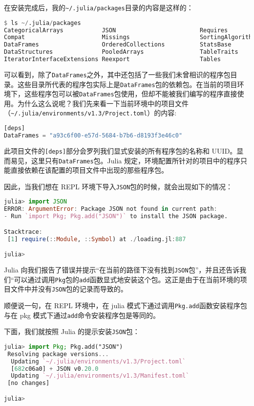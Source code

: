 在安装完成后，我的\verb|~/.julia/packages|目录的内容是这样的：

\begin{lstlisting}[language=julia]
$ ls ~/.julia/packages
CategoricalArrays           JSON                        Requires
Compat                      Missings                    SortingAlgorithms
DataFrames                  OrderedCollections          StatsBase
DataStructures              PooledArrays                TableTraits
IteratorInterfaceExtensions Reexport                    Tables
\end{lstlisting}

可以看到，除了\verb|DataFrames|之外，其中还包括了一些我们未曾相识的程序包目录。这些目录所代表的程序包实际上是\verb|DataFrames|包的依赖包。在当前的项目环境下，这些程序包可以被\verb|DataFrames|包使用，但却不能被我们编写的程序直接使用。为什么这么说呢？我们先来看一下当前环境中的项目文件（\verb|~/.julia/environments/v1.3/Project.toml|）的内容:

\begin{lstlisting}[language=julia]
[deps]
DataFrames = "a93c6f00-e57d-5684-b7b6-d8193f3e46c0"
\end{lstlisting}

此项目文件的\verb|[deps]|部分会罗列我们显式安装的所有程序包的名称和 UUID。显而易见，这里只有\verb|DataFrames|包。Julia 规定，环境配置所针对的项目中的程序只能直接依赖在该配置的项目文件中出现的那些程序包。

因此，当我们想在 REPL 环境下导入\verb|JSON|包的时候，就会出现如下的情况：

\begin{lstlisting}[language=julia]
julia> import JSON
ERROR: ArgumentError: Package JSON not found in current path:
- Run `import Pkg; Pkg.add("JSON")` to install the JSON package.

Stacktrace:
 [1] require(::Module, ::Symbol) at ./loading.jl:887

julia> 
\end{lstlisting}

Julia 向我们报告了错误并提示“在当前的路径下没有找到\verb|JSON|包”，并且还告诉我们“可以通过调用\verb|Pkg|包的\verb|add|函数显式地安装这个包。这正是由于在当前环境的项目文件中并没有\verb|JSON|包的记录而导致的。

顺便说一句，在 REPL 环境中，在 julia 模式下通过调用\verb|Pkg.add|函数安装程序包与在 pkg 模式下通过\verb|add|命令安装程序包是等同的。

下面，我们就按照 Julia 的提示安装\verb|JSON|包：

\begin{lstlisting}[language=julia]
julia> import Pkg; Pkg.add("JSON")
 Resolving package versions...
  Updating `~/.julia/environments/v1.3/Project.toml`
  [682c06a0] + JSON v0.20.0
  Updating `~/.julia/environments/v1.3/Manifest.toml`
 [no changes]

julia> 
\end{lstlisting}

